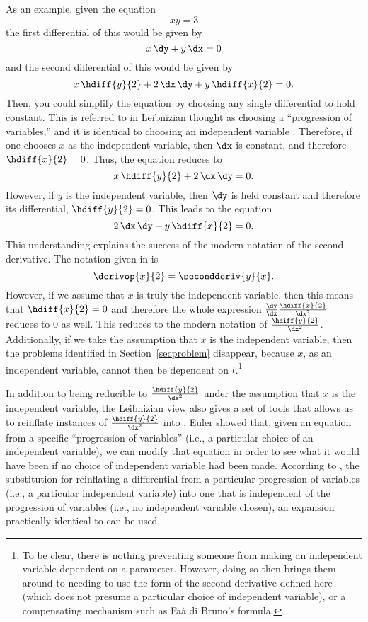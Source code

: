 As an example, given the equation
\[
xy = 3
\]
the first differential of this would be given by
\[
x\,\dy + y\,\dx = 0
\]
and the second differential of this would be given by
\[
x\,\hdiff{y}{2} + 2\,\dx\,\dy + y\,\hdiff{x}{2} = 0.
\]
Then, you could simplify the equation by choosing any single differential to hold constant.
This is referred to in Leibnizian thought as choosing a ``progression of variables,'' and it is identical to choosing an independent variable \citep[pg.~71]{bos1974}.
Therefore, if one chooses $x$ as the independent variable, then $\dx$ is constant, and therefore $\hdiff{x}{2} = 0$. 
Thus, the equation reduces to 
\[
x\,\hdiff{y}{2} + 2\,\dx\,\dy = 0.
\]
However, if $y$ is the independent variable, then $\dy$ is held constant and therefore its differential, $\hdiff{y}{2} = 0$.
This leads to the equation
\[
2\,\dx\,\dy + y\,\hdiff{x}{2} = 0.
\]
This understanding explains the success of the modern notation of the second derivative.
The notation given in  is
\[
\derivop{x}{2} = \secondderiv{y}{x}.
\]
However, if we assume that $x$ is truly the independent variable, then this means that $\hdiff{x}{2} = 0$ and therefore the whole expression $\frac{\dy}{\dx}\frac{\hdiff{x}{2}}{\dx^2}$ reduces to $0$ as well.
This reduces  to the modern notation of $\frac{\hdiff{y}{2}}{\dx^2}$.
Additionally, if we take the assumption that $x$ is the independent variable, then the problems identified in Section~\ref{secproblem} disappear, because $x$, as an independent variable, cannot then be dependent on $t$.\footnote{To 
be clear, there is nothing preventing someone from making an independent variable dependent on a parameter.  
However, doing so then brings them around to needing to use the form of the second derivative defined here (which does not presume a particular choice of independent variable), or a compensating mechanism such as Fa\`a di Bruno's formula.
} 

In addition to  being reducible to $\frac{\hdiff{y}{2}}{\dx^2}$ under the assumption that $x$ is the independent variable, the Leibnizian view also gives a set of tools that allows us to reinflate instances of $\frac{\hdiff{y}{2}}{\dx^2}$ into .
Euler showed that, given an equation from a specific ``progression of variables'' (i.e., a particular choice of an independent variable), we can modify that equation in order to see what it would have been if no choice of independent variable had been made.
According to \citep[pg.~75]{bos1974}, the substitution for reinflating a differential from a particular progression of variables (i.e., a particular independent variable) into one that is independent of the progression of variables (i.e., no independent variable chosen), an expansion practically identical to  can be used.

